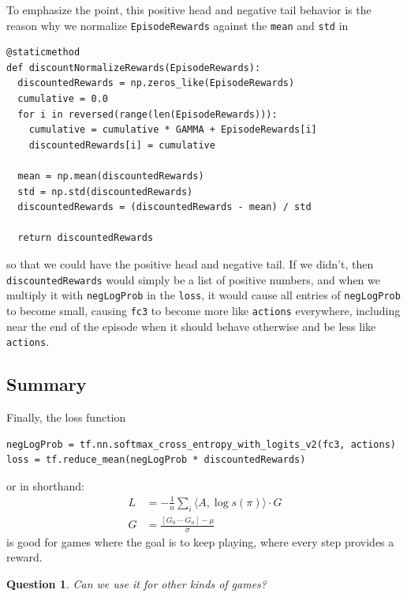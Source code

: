 \documentclass[20pt]{extarticle}
\theoremstyle{plain}
\newtheorem{question}[theorem]{Question}
\theoremstyle{definition}
\theoremstyle{remark}
\newcommand{\0}{\varnothing}
\newcommand{\m}{\mu}
\newcommand{\s}{\sigma}
\newcommand{\<}{\langle}
\renewcommand{\>}{\rangle}
\begin{document}
To emphasize the point, this positive head and negative tail behavior is the reason why we normalize \lstinline{EpisodeRewards} against the \lstinline{mean} and \lstinline{std} in

\footnotesize
\begin{lstlisting}
@staticmethod
def discountNormalizeRewards(EpisodeRewards):
  discountedRewards = np.zeros_like(EpisodeRewards)
  cumulative = 0.0
  for i in reversed(range(len(EpisodeRewards))):
    cumulative = cumulative * GAMMA + EpisodeRewards[i]
    discountedRewards[i] = cumulative

  mean = np.mean(discountedRewards)
  std = np.std(discountedRewards)
  discountedRewards = (discountedRewards - mean) / std

  return discountedRewards
\end{lstlisting}
\normalsize
so that we could have the positive head and negative tail. If we didn't, then \lstinline{discountedRewards} would simply be a list of positive numbers, and when we multiply it with \lstinline{negLogProb} in the \lstinline{loss}, it would cause all entries of \lstinline{negLogProb} to become small, causing \lstinline{fc3} to become more like \lstinline{actions} everywhere, including near the end of the episode when it should behave otherwise and be less like \lstinline{actions}.

\subsection{Summary}

Finally, the loss function

\scriptsize
\begin{lstlisting}
negLogProb = tf.nn.softmax_cross_entropy_with_logits_v2(fc3, actions)
loss = tf.reduce_mean(negLogProb * discountedRewards)
\end{lstlisting}
\normalsize
or in shorthand:
\begin{align*}
L &= - \frac{1}{n} \sum_{i} \< A, \log s(\pi) \> \cdot G \\
G &= \frac{[G_0 \ \cdots \ G_n] - \m}{\s}
\end{align*}
is good for games where the goal is to keep playing, where every step provides a reward.

\begin{question}
Can we use it for other kinds of games?
\end{question}
\end{document}
